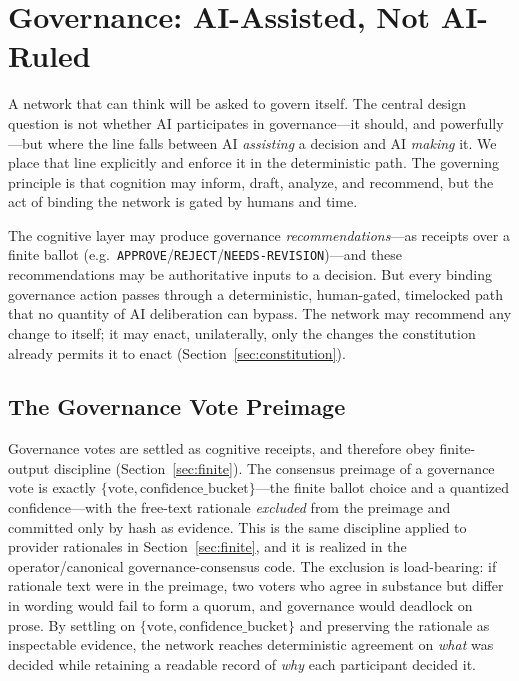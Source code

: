 \section{Governance: AI-Assisted, Not AI-Ruled}
\label{sec:governance}

A network that can think will be asked to govern itself. The central design question is not whether AI participates in governance---it should, and powerfully---but where the line falls between AI \emph{assisting} a decision and AI \emph{making} it. We place that line explicitly and enforce it in the deterministic path. The governing principle is that cognition may inform, draft, analyze, and recommend, but the act of binding the network is gated by humans and time.

\begin{principle}
\label{prin:assisted}
The cognitive layer may produce governance \emph{recommendations}---as \PoT{} receipts over a finite ballot (e.g.\ \texttt{APPROVE}/\texttt{REJECT}/\texttt{NEEDS-REVISION})---and these recommendations may be authoritative inputs to a decision. But every binding governance action passes through a deterministic, human-gated, timelocked path that no quantity of AI deliberation can bypass. The network may recommend any change to itself; it may enact, unilaterally, only the changes the constitution already permits it to enact (Section~\ref{sec:constitution}).
\end{principle}

\subsection{The Governance Vote Preimage}

Governance votes are settled as cognitive receipts, and therefore obey finite-output discipline (Section~\ref{sec:finite}). The consensus preimage of a governance vote is exactly $\{\text{vote}, \text{confidence\_bucket}\}$---the finite ballot choice and a quantized confidence---with the free-text rationale \emph{excluded} from the preimage and committed only by hash as evidence. This is the same discipline applied to provider rationales in Section~\ref{sec:finite}, and it is realized in the operator/canonical governance-consensus code. The exclusion is load-bearing: if rationale text were in the preimage, two voters who agree in substance but differ in wording would fail to form a quorum, and governance would deadlock on prose. By settling on $\{\text{vote}, \text{confidence\_bucket}\}$ and preserving the rationale as inspectable evidence, the network reaches deterministic agreement on \emph{what} was decided while retaining a readable record of \emph{why} each participant decided it.

